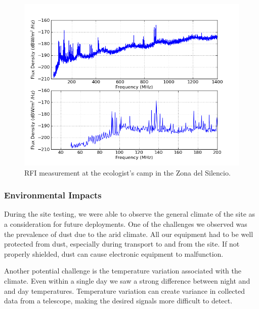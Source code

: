 
\begin{figure}[htb]
\begin{center}
\includegraphics[width=0.95\linewidth]{RFI_testing/figures/ZdS_halfway_in_cal.png}
\caption{RFI measurement at the ecologist's camp in the Zona del Silencio.}
\label{Fig:zdsendrfi}
\end{center}
\end{figure}


\subsubsection{Environmental Impacts}

During the site testing, we were able to observe the general climate of the site as a consideration for future deployments. One of the challenges we observed was the prevalence of dust due to the arid climate. All our equipment had to be well protected from dust, especially during transport to and from the site. If not properly shielded, dust can cause electronic equipment to malfunction. 

Another potential challenge is the temperature variation associated with the climate. Even within a single day we saw a strong difference between night and and day temperatures. Temperature variation can create variance in collected data from a telescope, making the desired signals more difficult to detect. 

